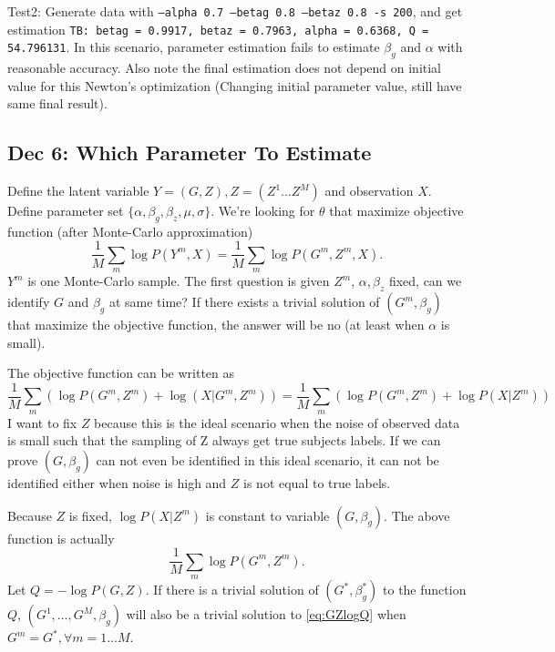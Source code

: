 \documentclass{article}
\begin{document}
Test2: Generate data with \texttt{--alpha 0.7 --betag 0.8 --betaz 0.8 -s 200}, and get estimation \texttt{TB: betag = 0.9917, betaz = 0.7963, alpha = 0.6368, Q = 54.796131}. In this scenario, parameter estimation fails to estimate $\beta_g$ and $\alpha$ with reasonable accuracy. Also note the final estimation does not depend on initial value for this Newton's optimization (Changing initial parameter value, still have same final result).

\subsection{Dec 6: Which Parameter To Estimate }
Define the latent variable $Y = (G,Z), Z = (Z^1 \dots Z^M)$ and observation $X$. Define parameter set $\{\alpha, \beta_g, \beta_z, \mu, \sigma\}$. We're looking for $\theta$ that maximize objective function (after Monte-Carlo approximation)
\[
\frac{1}{M}\sum_m \log P(Y^m, X) =  \frac{1}{M}\sum_m \log P(G^m, Z^m, X).
\]
$Y^m$ is one Monte-Carlo sample. The first question is given $Z^m$, $\alpha, \beta_z$ fixed, can we identify $G$ and $\beta_g$ at same time? If there exists a trivial solution of $(G^m, \beta_g)$ that maximize the objective function, the answer will be no (at least when $\alpha$ is small).

The objective function can be written as
\begin{equation}
\frac{1}{M}\sum_m \left( \log P(G^m, Z^m) + \log (X | G^m, Z^m) \right)  = \frac{1}{M}\sum_m \left( \log P(G^m, Z^m) + \log P(X | Z^m) \right) 
\label{eq:GZlogQ}
\end{equation}
I want to fix $Z$ because this is the ideal scenario when the noise of observed data is small such that the sampling of Z always get true subjects labels. If we can prove $(G, \beta_g)$ can not even be identified in this ideal scenario, it can not be identified either when noise is high and $Z$ is not equal to true labels. 

Because $Z$ is fixed, $\log P(X | Z^m)$ is constant to variable $(G, \beta_g)$. The above function is actually 
\[
\frac{1}{M}\sum_m  \log P(G^m, Z^m).
\]
Let $Q = - \log P(G, Z)$. If there is a trivial solution of $(G^*,\beta_g^*)$ to the function $Q$, $(G^1, \dots, G^M, \beta_g)$ will also be a trivial solution to \eqref{eq:GZlogQ} when $G^m = G^*,  \forall m=1\dots M$.
\end{document}
